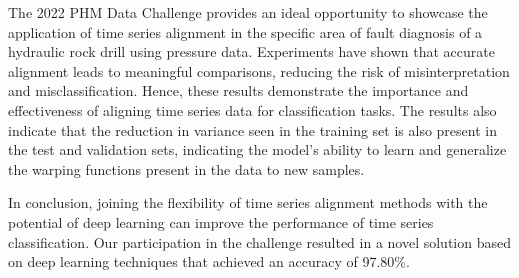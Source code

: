 The 2022 PHM Data Challenge provides an ideal opportunity to showcase the application of time series alignment in the specific area of fault diagnosis of a hydraulic rock drill using pressure data. 
Experiments have shown that accurate alignment leads to meaningful comparisons, reducing the risk of misinterpretation and misclassification. Hence, these results demonstrate the importance and effectiveness of aligning time series data for classification tasks. 
The results also indicate that the reduction in variance seen in the training set is also present in the test and validation sets, indicating the model's ability to learn and generalize the warping functions present in the data to new samples. 


In conclusion, joining the flexibility of time series alignment methods with the potential of deep learning can improve the performance of time series classification. Our participation in the challenge resulted in a novel solution based on deep learning techniques that achieved an accuracy of 97.80\%. %




